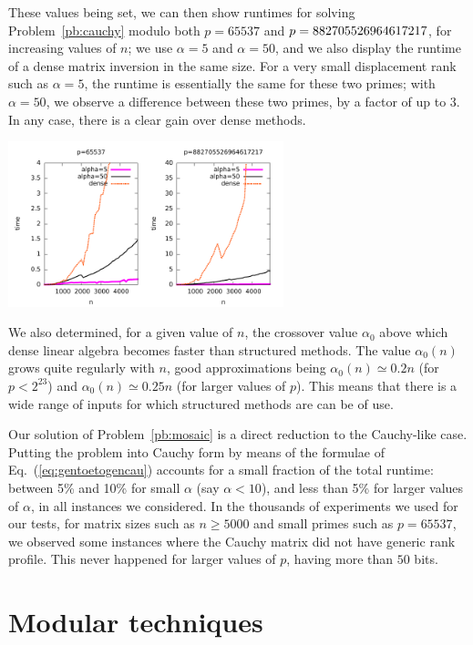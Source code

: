 \documentclass{sig-alternate}
\begin{document}
These values being set, we can then show runtimes for solving
Problem~\ref{pb:cauchy} modulo both $p=65537$ and
$p=8827055\-26964617217$, for increasing values of $n$; we use
$\alpha=5$ and $\alpha=50$, and we also display the runtime of a dense
matrix inversion in the same size. For a very small displacement rank
such as $\alpha=5$, the runtime is essentially the same for these two
primes; with $\alpha=50$, we observe a difference between these two
primes, by a factor of up to 3. In any case, there is a clear gain
over dense methods.

\includegraphics[width=8cm]{large_n-eschost-desktop.pdf}

We also determined, for a given value of $n$, the crossover value
$\alpha_0$ above which dense linear algebra becomes faster than
structured methods.  The value $\alpha_0(n)$ grows quite regularly
with $n$, good approximations being $\alpha_0(n) \simeq 0.2 n$ (for $p
< 2^{23}$) and $\alpha_0(n) \simeq 0.25 n$ (for larger values of
$p$). This means that there is a wide range of inputs for which
structured methods are can be of use.

Our solution of Problem~\ref{pb:mosaic} is a direct reduction to the
Cauchy-like case. Putting the problem into Cauchy form by means of the
formulae of Eq.~(\ref{eq:gentoetogencau}) accounts for a small
fraction of the total runtime: between 5\% and 10\% for small $\alpha$
(say $\alpha < 10$), and less than 5\% for larger values of $\alpha$,
in all instances we considered.  In the thousands of experiments we used
for our tests, for matrix sizes such as $n \ge 5000$ and small primes
such as $p=65537$, we observed some instances where the Cauchy matrix
did not have generic rank profile. This never happened for larger 
values of $p$, having more than $50$ bits.



\section{Modular techniques}\label{sec:lifting}
\end{document}
